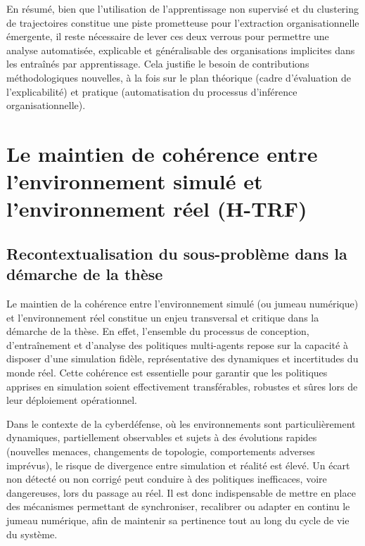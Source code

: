 En résumé, bien que l’utilisation de l’apprentissage non supervisé et du clustering de trajectoires constitue une piste prometteuse pour l’extraction organisationnelle émergente, il reste nécessaire de lever ces deux verrous pour permettre une analyse automatisée, explicable et généralisable des organisations implicites dans les  entraînés par apprentissage. Cela justifie le besoin de contributions méthodologiques nouvelles, à la fois sur le plan théorique (cadre d’évaluation de l’explicabilité) et pratique (automatisation du processus d’inférence organisationnelle).



\section{Le maintien de cohérence entre l'environnement simulé et l'environnement réel (H-TRF)}

\subsection*{Recontextualisation du sous-problème dans la démarche de la thèse}

Le maintien de la cohérence entre l'environnement simulé (ou jumeau numérique) et l'environnement réel constitue un enjeu transversal et critique dans la démarche de la thèse. En effet, l'ensemble du processus de conception, d'entraînement et d'analyse des politiques multi-agents repose sur la capacité à disposer d'une simulation fidèle, représentative des dynamiques et incertitudes du monde réel. Cette cohérence est essentielle pour garantir que les politiques apprises en simulation soient effectivement transférables, robustes et sûres lors de leur déploiement opérationnel.

Dans le contexte de la cyberdéfense, où les environnements sont particulièrement dynamiques, partiellement observables et sujets à des évolutions rapides (nouvelles menaces, changements de topologie, comportements adverses imprévus), le risque de divergence entre simulation et réalité est élevé. Un écart non détecté ou non corrigé peut conduire à des politiques inefficaces, voire dangereuses, lors du passage au réel. Il est donc indispensable de mettre en place des mécanismes permettant de synchroniser, recalibrer ou adapter en continu le jumeau numérique, afin de maintenir sa pertinence tout au long du cycle de vie du système.

